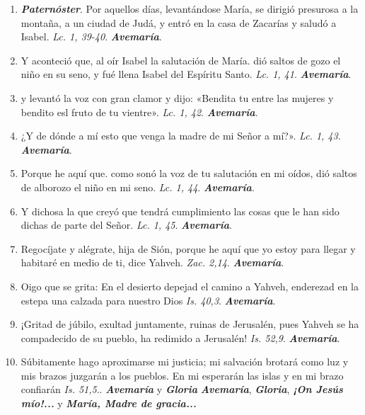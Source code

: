 \documentclass[./rosary.tex]{subfiles}
\begin{document}
\begin{enumerate}
      \item \textbf{\emph{Paternóster}}. Por aquellos días, levantándose María, se dirigió presurosa a la montaña, a un ciudad de Judá, y entró en la casa de Zacarías y saludó a Isabel. \emph{Lc. 1, 39-40}. \textbf{\emph{Avemaría}}.

      \item Y aconteció que, al oír Isabel la salutación de María. dió saltos de gozo el niño en su seno, y fué llena Isabel del Espíritu Santo. \emph{Lc. 1, 41}. \textbf{\emph{Avemaría}}.

      \item y levantó la voz con gran clamor y dijo: «Bendita tu entre las mujeres y bendito esl fruto de tu vientre». \emph{Lc. 1, 42}. \textbf{\emph{Avemaría}}.

      \item ¿Y de dónde a mí esto que venga la madre de mi Señor a mí?». \emph{Lc. 1, 43}. \textbf{\emph{Avemaría}}.

      \item Porque he aquí que. como sonó la voz de tu salutación en mi oídos, dió saltos de alborozo el niño en mi seno. \emph{Lc. 1, 44}. \textbf{\emph{Avemaría}}.

      \item Y dichosa la que creyó que tendrá cumplimiento las cosas que le han sido dichas de parte del Señor. \emph{Lc. 1, 45}. \textbf{\emph{Avemaría}}.

      \item Regocíjate y alégrate, hija de Sión, porque he aquí que yo estoy para llegar y habitaré en medio de ti, dice Yahveh. \emph{Zac. 2,14}. \textbf{\emph{Avemaría}}.

      \item Oigo que se grita: En el desierto depejad el camino a Yahveh, enderezad en la estepa una calzada para nuestro Dios \emph{Is. 40,3}. \textbf{\emph{Avemaría}}.

      \item ¡Gritad de júbilo, exultad juntamente, ruinas de Jerusalén, pues Yahveh se ha compadecido de su pueblo, ha redimido a Jerusalén! \emph{Is. 52,9}. \textbf{\emph{Avemaría}}.

      \item Súbitamente hago aproximarse mi justicia; mi salvación brotará como luz y mis brazos juzgarán a los pueblos. En mi esperarán las islas y en mi brazo confiarán \emph{Is. 51,5}.. \textbf{\emph{Avemaría}} y \textbf{\emph{Gloria}}
            \textbf{\emph{Avemaría}}, \textbf{\emph{Gloria}}, \textbf{\emph{¡On Jesús mío!...}} y \textbf{\emph{María, Madre de gracia...}}
\end{enumerate}
\end{document}

